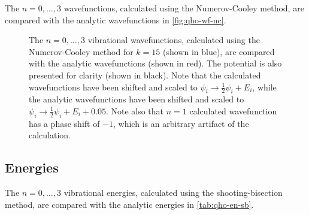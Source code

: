 \documentclass{article}
\begin{document}
The $n = 0, \dotsc, 3$ wavefunctions, calculated using the Numerov-Cooley
method, are compared with the analytic wavefunctions in \autoref{fig:qho-wf-nc}.

\begin{figure}[h]
  \begin{center}
    
  \end{center}
  \caption[N-C Wavefunctions]{
    The $n = 0, \dotsc, 3$ vibrational wavefunctions, calculated using the
    Numerov-Cooley method for $k = 15$ (shown in blue), are compared with the
    analytic wavefunctions (shown in red).
    The potential is also presented for clarity (shown in black).
    Note that the calculated wavefunctions have been shifted and scaled to
    $\psi_{i} \to \tfrac{1}{2}\psi_{i} + E_{i}$, while the analytic
    wavefunctions have been shifted and scaled to
    $\psi_{i} \to \tfrac{1}{2}\psi_{i} + E_{i} + 0.05$.
    Note also that $n = 1$ calculated wavefunction has a phase shift of $-1$,
    which is an arbitrary artifact of the calculation.
  }
  \label{fig:qho-wf-nc}
\end{figure}

\subsection*{Energies}
\label{sec:qho-energies}

The $n = 0, \dotsc, 3$ vibrational energies, calculated using the
shooting-bisection method, are compared with the analytic energies in
\autoref{tab:qho-en-sb}.
\end{document}
